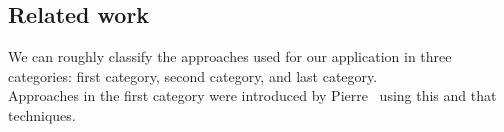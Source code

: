 \subsection{Related work}
%
We can roughly classify the approaches used for our application in three categories: first category, second category, and last category.\\
Approaches in the first category were introduced by Pierre~\cite{Sibgrapi2014} using this and that techniques.



